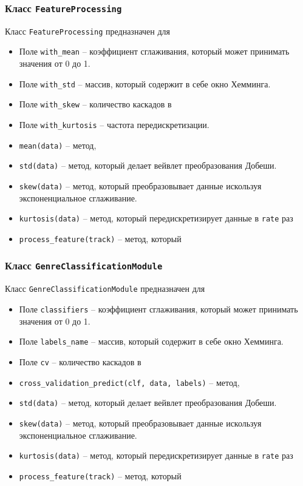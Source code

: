 \subsubsection{Класс \texttt{FeatureProcessing}}

Класс \texttt{FeatureProcessing} предназначен для

\begin{itemize}
\item{Поле \texttt{with\_mean} -- коэффициент сглаживания, который может принимать значения от 0 до 1.}
\item{Поле \texttt{with\_std} -- массив, который содержит в себе окно Хемминга.}
\item{Поле \texttt{with\_skew} -- количество каскадов в }
\item{Поле \texttt{with\_kurtosis} -- частота передискретизации.}
\item{\texttt{mean(data)} -- метод, }
\item{\texttt{std(data)} -- метод, который  делает вейвлет преобразования Добеши. }
\item{\texttt{skew(data)} -- метод, который преобразовывает данные искользуя экспоненциальное сглаживание.}
\item{\texttt{kurtosis(data)} -- метод, который передискретизирует данные в \texttt{rate} раз }
\item{\texttt{process\_feature(track)} -- метод, который}
\end{itemize}

\subsubsection{Класс \texttt{GenreClassificationModule}}

Класс \texttt{GenreClassificationModule} предназначен для

\begin{itemize}
\item{Поле \texttt{classifiers} -- коэффициент сглаживания, который может принимать значения от 0 до 1.}
\item{Поле \texttt{labels\_name} -- массив, который содержит в себе окно Хемминга.}
\item{Поле \texttt{cv} -- количество каскадов в }
\item{\texttt{cross\_validation\_predict(clf, data, labels)} -- метод, }
\item{\texttt{std(data)} -- метод, который  делает вейвлет преобразования Добеши. }
\item{\texttt{skew(data)} -- метод, который преобразовывает данные искользуя экспоненциальное сглаживание.}
\item{\texttt{kurtosis(data)} -- метод, который передискретизирует данные в \texttt{rate} раз }
\item{\texttt{process\_feature(track)} -- метод, который}
\end{itemize}




